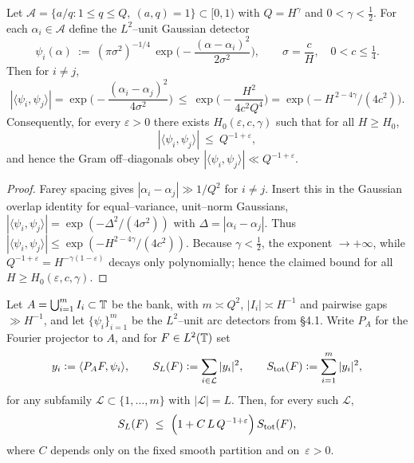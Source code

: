 \begin{lemma}\label{lem:AO-near-orth}
Let $\mathcal A=\{a/q:1\le q\le Q,\ (a,q)=1\}\subset[0,1)$ with $Q=H^\gamma$ and $0<\gamma<\tfrac12$.
For each $\alpha_i\in\mathcal A$ define the $L^2$–unit Gaussian detector
\[
\psi_i(\alpha)\ :=\ (\pi\sigma^2)^{-1/4}\,\exp\!\Big(-\frac{(\alpha-\alpha_i)^2}{2\sigma^2}\Big),
\qquad \sigma=\frac{c}{H},\quad 0<c\le \tfrac14.
\]
Then for $i\neq j$,
\[
|\langle \psi_i,\psi_j\rangle|
=\exp\!\Big(-\frac{(\alpha_i-\alpha_j)^2}{4\sigma^2}\Big)
\ \le\ \exp\!\Big(-\frac{H^2}{4c^2Q^4}\Big)
=\exp\!\big(-H^{\,2-4\gamma}/(4c^2)\big).
\]
Consequently, for every $\varepsilon>0$ there exists $H_0(\varepsilon,c,\gamma)$ such that for all $H\ge H_0$,
\[
|\langle \psi_i,\psi_j\rangle|\ \le\ Q^{-1+\varepsilon},
\]
and hence the Gram off–diagonals obey $|\langle\psi_i,\psi_j\rangle|\ll Q^{-1+\varepsilon}$.
\end{lemma}

\begin{proof}
Farey spacing gives $|\alpha_i-\alpha_j|\gg 1/Q^2$ for $i\neq j$. Insert this in the Gaussian overlap identity for equal–variance, unit–norm Gaussians,
$|\langle \psi_i,\psi_j\rangle|=\exp(-\Delta^2/(4\sigma^2))$ with $\Delta=|\alpha_i-\alpha_j|$.
Thus $|\langle \psi_i,\psi_j\rangle|\le \exp(-H^{2-4\gamma}/(4c^2))$.
Because $\gamma<\tfrac12$, the exponent $\to+\infty$, while $Q^{-1+\varepsilon}=H^{-\gamma(1-\varepsilon)}$ decays only polynomially; hence the claimed bound for all $H\ge H_0(\varepsilon,c,\gamma)$.
\end{proof}

\begin{proposition}\label{prop:AO-projected}
Let $A=\bigcup_{i=1}^m I_i\subset\mathbb{T}$ be the bank, with $m\asymp Q^2$, $|I_i|\asymp H^{-1}$ and pairwise gaps $\gg H^{-1}$, and let $\{\psi_i\}_{i=1}^m$ be the $L^2$–unit arc detectors from §4.1. 
Write $P_A$ for the Fourier projector to $A$, and for $F\in L^2(\mathbb{T})$ set 
\[
y_i:=\langle P_A F,\psi_i\rangle,\qquad S_L(F):=\sum_{i\in\mathcal L}|y_i|^2,\qquad S_{\rm tot}(F):=\sum_{i=1}^m |y_i|^2,
\]
for any subfamily $\mathcal L\subset\{1,\dots,m\}$ with $|\mathcal L|=L$. 
Then, for every such $\mathcal L$,
\begin{equation}\label{eq:AO-deterministic}
S_L(F)\ \le\ \Bigl(1+C\,L\,Q^{-1+\varepsilon}\Bigr)\,S_{\rm tot}(F),
\end{equation}
where $C$ depends only on the fixed smooth partition and on~$\varepsilon>0$.
\end{proposition}

